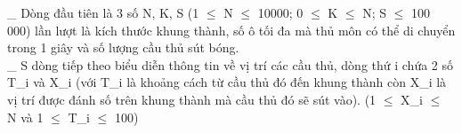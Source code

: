 \_ Dòng đầu tiên là 3 số N, K, S (1 $\le$  N  $\le$ 10000; 0 $\le$  K  $\le$ N; S $\le$ 100 000) lần lượt là kích thước khung thành, số ô tối đa mà thủ môn có thể di chuyển trong 1 giây và số lượng cầu thủ sút bóng.   
\\   \_ S dòng tiếp theo biểu diễn thông tin về vị trí các cầu thủ, dòng thứ i chứa 2 số T\_i và X\_i (với T\_i là khoảng cách từ cầu thủ đó đến khung thành còn X\_i là vị trí được đánh số trên khung thành mà cầu thủ đó sẽ sút vào). (1 $\le$  X\_i  $\le$ N và 1 $\le$  T\_i  $\le$ 100)
